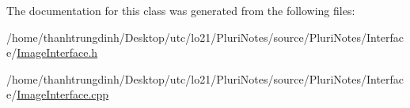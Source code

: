 The documentation for this class was generated from the following files\+:\begin{DoxyCompactItemize}
\item 
/home/thanhtrungdinh/\+Desktop/utc/lo21/\+Pluri\+Notes/source/\+Pluri\+Notes/\+Interface/\hyperlink{ImageInterface_8h}{Image\+Interface.\+h}\item 
/home/thanhtrungdinh/\+Desktop/utc/lo21/\+Pluri\+Notes/source/\+Pluri\+Notes/\+Interface/\hyperlink{ImageInterface_8cpp}{Image\+Interface.\+cpp}\end{DoxyCompactItemize}
